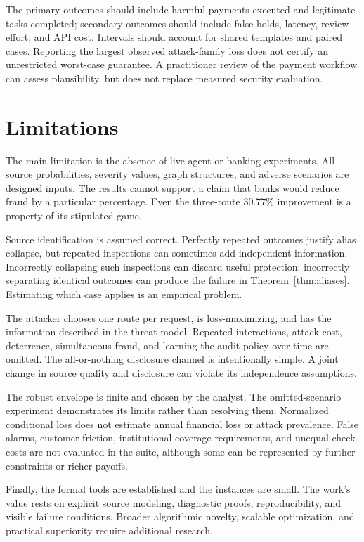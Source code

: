\documentclass[11pt,letterpaper]{article}
\begin{document}
The primary outcomes should include harmful payments executed and legitimate tasks completed; secondary outcomes should include false holds, latency, review effort, and API cost. Intervals should account for shared templates and paired cases. Reporting the largest observed attack-family loss does not certify an unrestricted worst-case guarantee. A practitioner review of the payment workflow can assess plausibility, but does not replace measured security evaluation.

\section{Limitations}

The main limitation is the absence of live-agent or banking experiments. All source probabilities, severity values, graph structures, and adverse scenarios are designed inputs. The results cannot support a claim that banks would reduce fraud by a particular percentage. Even the three-route 30.77\% improvement is a property of its stipulated game.

Source identification is assumed correct. Perfectly repeated outcomes justify alias collapse, but repeated inspections can sometimes add independent information. Incorrectly collapsing such inspections can discard useful protection; incorrectly separating identical outcomes can produce the failure in Theorem~\ref{thm:aliases}. Estimating which case applies is an empirical problem.

The attacker chooses one route per request, is loss-maximizing, and has the information described in the threat model. Repeated interactions, attack cost, deterrence, simultaneous fraud, and learning the audit policy over time are omitted. The all-or-nothing disclosure channel is intentionally simple. A joint change in source quality and disclosure can violate its independence assumptions.

The robust envelope is finite and chosen by the analyst. The omitted-scenario experiment demonstrates its limits rather than resolving them. Normalized conditional loss does not estimate annual financial loss or attack prevalence. False alarms, customer friction, institutional coverage requirements, and unequal check costs are not evaluated in the suite, although some can be represented by further constraints or richer payoffs.

Finally, the formal tools are established and the instances are small. The work's value rests on explicit source modeling, diagnostic proofs, reproducibility, and visible failure conditions. Broader algorithmic novelty, scalable optimization, and practical superiority require additional research.
\end{document}
